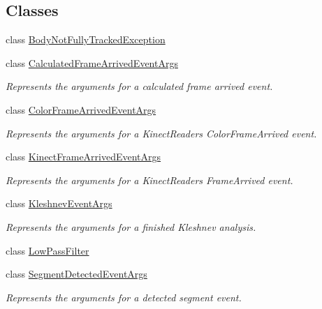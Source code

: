 \subsection*{Classes}
\begin{DoxyCompactItemize}
\item 
class \hyperlink{class_rowing_monitor_1_1_model_1_1_body_not_fully_tracked_exception}{Body\+Not\+Fully\+Tracked\+Exception}
\item 
class \hyperlink{class_rowing_monitor_1_1_model_1_1_calculated_frame_arrived_event_args}{Calculated\+Frame\+Arrived\+Event\+Args}
\begin{DoxyCompactList}\small\item\em Represents the arguments for a calculated frame arrived event. \end{DoxyCompactList}\item 
class \hyperlink{class_rowing_monitor_1_1_model_1_1_color_frame_arrived_event_args}{Color\+Frame\+Arrived\+Event\+Args}
\begin{DoxyCompactList}\small\item\em Represents the arguments for a Kinect\+Reader\textquotesingle{}s Color\+Frame\+Arrived event. \end{DoxyCompactList}\item 
class \hyperlink{class_rowing_monitor_1_1_model_1_1_kinect_frame_arrived_event_args}{Kinect\+Frame\+Arrived\+Event\+Args}
\begin{DoxyCompactList}\small\item\em Represents the arguments for a Kinect\+Reader\textquotesingle{}s Frame\+Arrived event. \end{DoxyCompactList}\item 
class \hyperlink{class_rowing_monitor_1_1_model_1_1_kleshnev_event_args}{Kleshnev\+Event\+Args}
\begin{DoxyCompactList}\small\item\em Represents the arguments for a finished Kleshnev analysis. \end{DoxyCompactList}\item 
class \hyperlink{class_rowing_monitor_1_1_model_1_1_low_pass_filter}{Low\+Pass\+Filter}
\item 
class \hyperlink{class_rowing_monitor_1_1_model_1_1_segment_detected_event_args}{Segment\+Detected\+Event\+Args}
\begin{DoxyCompactList}\small\item\em Represents the arguments for a detected segment event. \end{DoxyCompactList}\item 

\end{DoxyCompactItemize}
